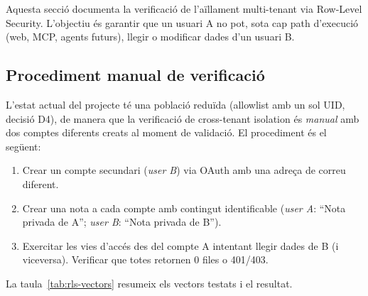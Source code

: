 Aquesta secció documenta la verificació de l'aïllament multi-tenant via Row-Level Security. L'objectiu és garantir que un usuari A no pot, sota cap path d'execució (web, MCP, agents futurs), llegir o modificar dades d'un usuari B.

\subsection{Procediment manual de verificació}

L'estat actual del projecte té una població reduïda (allowlist amb un sol UID, decisió D4), de manera que la verificació de cross-tenant isolation és \emph{manual} amb dos comptes diferents creats al moment de validació. El procediment és el següent:

\begin{enumerate}
    \item Crear un compte secundari (\emph{user B}) via OAuth amb una adreça de correu diferent.
    \item Crear una nota a cada compte amb contingut identificable (\emph{user A}: ``Nota privada de A''; \emph{user B}: ``Nota privada de B'').
    \item Exercitar les vies d'accés des del compte A intentant llegir dades de B (i viceversa). Verificar que totes retornen 0 files o 401/403.
\end{enumerate}

La taula~\ref{tab:rls-vectors} resumeix els vectors testats i el resultat.

